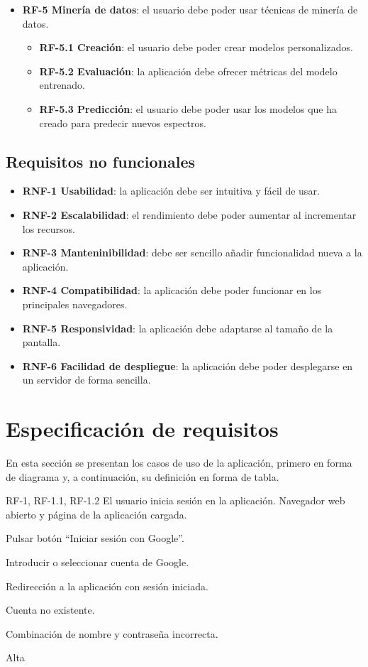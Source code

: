 \begin{itemize}
\begin{itemize}
	\end{itemize}
	\item \textbf{RF-5 Minería de datos}: el usuario debe poder usar técnicas 
	de minería de datos.
	\begin{itemize}
		\item \textbf{RF-5.1 Creación}: el usuario debe poder crear modelos 
		personalizados.
		\item \textbf{RF-5.2 Evaluación}: la aplicación debe ofrecer métricas 
		del modelo entrenado.
		\item \textbf{RF-5.3 Predicción}: el usuario debe poder usar los 
		modelos que ha creado para predecir nuevos espectros.
	\end{itemize}
\end{itemize}

\subsection{Requisitos no funcionales}

	\begin{itemize}
	\item \textbf{RNF-1 Usabilidad}: la aplicación debe ser intuitiva y fácil 
	de usar.
	\item \textbf{RNF-2 Escalabilidad}: el rendimiento debe poder aumentar al 
	incrementar los recursos.
	\item \textbf{RNF-3 Manteninibilidad}: debe ser sencillo añadir 
	funcionalidad nueva a la aplicación.
	\item \textbf{RNF-4 Compatibilidad}: la aplicación debe poder funcionar en 
	los principales navegadores.
	\item \textbf{RNF-5 Responsividad}: la aplicación debe adaptarse al tamaño 
	de la pantalla.
	\item \textbf{RNF-6 Facilidad de despliegue}: la aplicación debe poder 
	desplegarse en un servidor de forma sencilla.
	\end{itemize}

\section{Especificación de requisitos}

En esta sección se presentan los casos de uso de la aplicación, primero en 
forma de diagrama y, a continuación, su definición en forma de tabla.


{RF-1, RF-1.1, RF-1.2}
{El usuario inicia sesión en la aplicación.}
{Navegador web abierto y página de la aplicación cargada.}
{
	\item Pulsar botón ``Iniciar sesión con Google''.
	\item Introducir o seleccionar cuenta de Google.
}
{Redirección a la aplicación con sesión iniciada.}
{	\item Cuenta no existente.
	\item Combinación de nombre y contraseña incorrecta.
}
{Alta}


